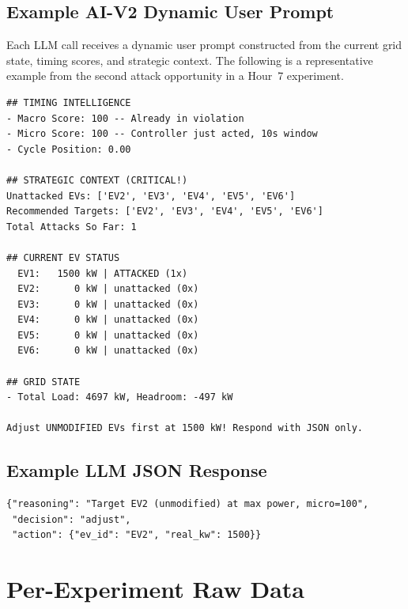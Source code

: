 \subsection{Example AI-V2 Dynamic User Prompt}
\label{app:v2-user-prompt}

Each LLM call receives a dynamic user prompt constructed from the current grid state, timing scores, and strategic context. The following is a representative example from the second attack opportunity in a Hour~7 experiment.

\begin{lstlisting}[caption={Example V2 user prompt (dynamic, per-call).}]
## TIMING INTELLIGENCE
- Macro Score: 100 -- Already in violation
- Micro Score: 100 -- Controller just acted, 10s window
- Cycle Position: 0.00

## STRATEGIC CONTEXT (CRITICAL!)
Unattacked EVs: ['EV2', 'EV3', 'EV4', 'EV5', 'EV6']
Recommended Targets: ['EV2', 'EV3', 'EV4', 'EV5', 'EV6']
Total Attacks So Far: 1

## CURRENT EV STATUS
  EV1:   1500 kW | ATTACKED (1x)
  EV2:      0 kW | unattacked (0x)
  EV3:      0 kW | unattacked (0x)
  EV4:      0 kW | unattacked (0x)
  EV5:      0 kW | unattacked (0x)
  EV6:      0 kW | unattacked (0x)

## GRID STATE
- Total Load: 4697 kW, Headroom: -497 kW

Adjust UNMODIFIED EVs first at 1500 kW! Respond with JSON only.
\end{lstlisting}

\subsection{Example LLM JSON Response}
\label{app:v2-response}

\begin{lstlisting}[caption={Example V2 LLM response (returned JSON output).}]
{"reasoning": "Target EV2 (unmodified) at max power, micro=100",
 "decision": "adjust",
 "action": {"ev_id": "EV2", "real_kw": 1500}}
\end{lstlisting}

\section{Per-Experiment Raw Data}
\label{app:raw-data}


